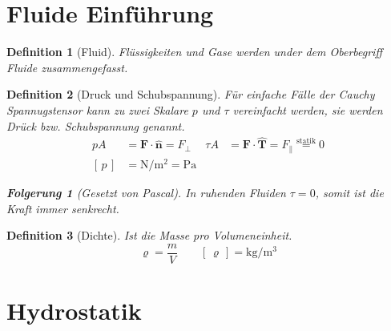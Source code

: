 \documentclass[a4paper, twocolumn]{article}
\numberwithin{equation}{section}
\theoremstyle{hsr-def}
\newtheorem{definition}{Definition}[section]
\theoremstyle{hsr-sub}
\newtheorem{result}{Folgerung}[definition]
\theoremstyle{hsr-unnum}
\renewcommand{\vec}[1]{\ensuremath{\mathbf{#1}}}
\newcommand{\uvec}[1]{\ensuremath{\vec{\hat{#1}}}}
\newcommand{\unitsof}[1]{\ensuremath{\left[\,#1\,\right]}}
\begin{document}
\section{Fluide Einf\"uhrung}

\begin{definition}[Fluid]
Fl\"ussigkeiten und Gase werden under dem Oberbegriff \emph{Fluide} zusammengefasst.
\end{definition}



\begin{definition}[Druck und Schubspannung]
F\"ur einfache F\"alle der Cauchy Spannugstensor kann zu zwei Skalare \(p\) und \(\tau\) vereinfacht werden, sie werden Dr\"uck bzw. Schubspannung genannt.
\begin{align*}
    pA
    &= \vec{F}\cdot\uvec{n}
    = F_\perp
    &
    \tau A
    &= \vec{F}\cdot\uvec{T}
    = F_\parallel
    \stackrel{\text{statik}}{=} 0
    \\
    \unitsof{p} &= \si{\newton\per\square\metre} = \si{\pascal} 
\end{align*}

\begin{result}[Gesetzt von Pascal]
In ruhenden Fluiden \(\tau = 0\), somit ist die Kraft immer senkrecht.
\end{result}
\end{definition}

\begin{definition}[Dichte] Ist die Masse pro Volumeneinheit.
\[
    \varrho = \frac{m}{V} \qquad \unitsof{\varrho} = \si{\kilo\gram\per\cubic\metre}
\]
\end{definition}

\section{Hydrostatik}
\end{document}
